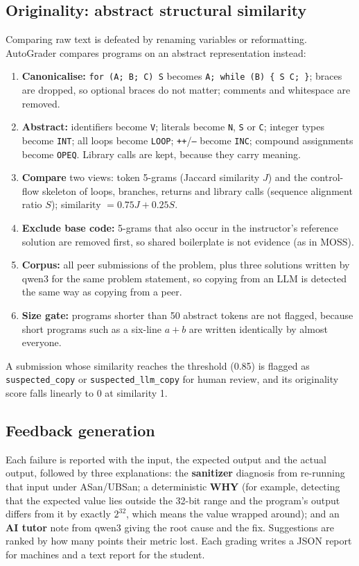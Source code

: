 \documentclass[11pt,a4paper]{article}
\begin{document}
\subsection{Originality: abstract structural similarity}\label{sec:similarity}
Comparing raw text is defeated by renaming variables or reformatting. AutoGrader compares programs on an abstract
representation instead:
\begin{enumerate}
  \item \textbf{Canonicalise:} \texttt{for (A; B; C) S} becomes \texttt{A; while (B) \{ S C; \}}; braces are dropped,
        so optional braces do not matter; comments and whitespace are removed.
  \item \textbf{Abstract:} identifiers become \texttt{V}; literals become \texttt{N}, \texttt{S} or \texttt{C};
        integer types become \texttt{INT}; all loops become \texttt{LOOP}; \texttt{++}/\texttt{--} become \texttt{INC};
        compound assignments become \texttt{OPEQ}. Library calls are kept, because they carry meaning.
  \item \textbf{Compare} two views: token 5-grams (Jaccard similarity $J$) and the control-flow skeleton of loops,
        branches, returns and library calls (sequence alignment ratio $S$); similarity $= 0.75J + 0.25S$.
  \item \textbf{Exclude base code:} 5-grams that also occur in the instructor's reference solution are removed first,
        so shared boilerplate is not evidence (as in MOSS).
  \item \textbf{Corpus:} all peer submissions of the problem, plus three solutions written by qwen3 for the same
        problem statement, so copying from an LLM is detected the same way as copying from a peer.
  \item \textbf{Size gate:} programs shorter than 50 abstract tokens are not flagged, because short programs such as a
        six-line $a+b$ are written identically by almost everyone.
\end{enumerate}
A submission whose similarity reaches the threshold (0.85) is flagged as \texttt{suspected\_copy} or
\texttt{suspected\_llm\_copy} for human review, and its originality score falls linearly to 0 at similarity 1.

\subsection{Feedback generation}\label{sec:feedback}
Each failure is reported with the input, the expected output and the actual output, followed by three explanations:
the \textbf{sanitizer} diagnosis from re-running that input under ASan/UBSan; a deterministic \textbf{WHY} (for
example, detecting that the expected value lies outside the 32-bit range and the program's output differs from it by
exactly $2^{32}$, which means the value wrapped around); and an \textbf{AI tutor} note from qwen3 giving the root cause
and the fix. Suggestions are ranked by how many points their metric lost. Each grading writes a JSON report for
machines and a text report for the student.
\end{document}
